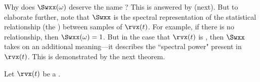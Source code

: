 \begin{remark}
\label{rem:spower}
Why does $\Swxx(\omega)$ deserve the name ?
This is answered by  (next).
But to elaborate further, note that $\Swxx$ is the spectral representation of 
the statistical relationship (the ) between samples of $\rvx(t)$. 
For example, if there is no relationship, then $\Swxx(\omega)=1$.
But in the case that $\rvx(t)$ is , then $\Swxx$ takes on 
an additional meaning---it describes the ``spectral power" present in $\rvx(t)$.
This is demonstrated by the next theorem.
\end{remark}

\begin{theorem}
\label{thm:psd_ergodic}
Let $\rvx(t)$ be a .
\end{theorem}
